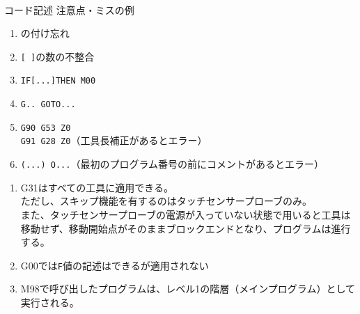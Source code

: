 \begin{appendices}
\Appendixpart




\clearpage
~\vfill
\begin{Column}{コード記述 注意点・ミスの例}
\begin{enumerate}
\item \ttNum\hx の付け忘れ
\item \verb|[ ]|の数の不整合
\item \verb|IF[...]THEN M00|
\item \verb|G.. GOTO...|
\item \verb|G90 G53 Z0|\\
      \verb|G91 G28 Z0|（工具長補正があるとエラー）
\item \verb|(...) O...|（最初のプログラム番号の前にコメントがあるとエラー）
\end{enumerate}
\tcbline*
\begin{enumerate}
\item
{\ttfamily G31}はすべての工具に適用できる。\\
ただし、スキップ機能を有するのはタッチセンサープローブのみ。\\
また、タッチセンサープローブの電源が入っていない状態で用いると工具は移動せず、移動開始点がそのままブロックエンドとなり、プログラムは進行する。
\item {\ttfamily G00}では\verb|F|値の記述はできるが適用されない
\item {\ttfamily M98}で呼び出したプログラムは、レベル1の階層（メインプログラム）として実行される。
\end{enumerate}
\end{Column}
\end{appendices}

\clearrightpage